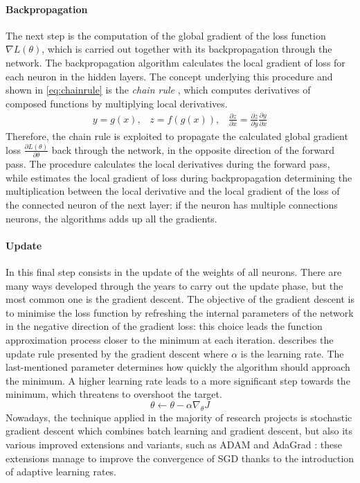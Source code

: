 \paragraph{Backpropagation}
The next step is the computation of the global gradient of the loss function $\nabla L(\theta)$, which is carried out together with its backpropagation through the network. The backpropagation algorithm \cite{rumelhart1988learning} calculates the local gradient of loss for each neuron in the hidden layers. The concept underlying this procedure and shown in \vref{eq:chainrule} is the \textit{chain rule} \cite{lecun2015deep}, which computes derivatives of composed functions by multiplying local derivatives.
\begin{equation}\label{eq:chainrule}
\begin{gathered}
y = g(x), \;\;\; z = f(g(x)),  \;\;\;
\frac{\partial z}{\partial x} = \frac{\partial z}{\partial y} \frac{\partial y}{\partial x}
\end{gathered}
\end{equation}
Therefore, the chain rule is exploited to propagate the calculated global gradient loss $\frac{\partial L(\theta)}{\partial \theta}$ back through the network, in the opposite direction of the forward pass.
The procedure calculates the local derivatives during the forward pass, while estimates the local gradient of loss during backpropagation determining the multiplication between the local derivative and the local gradient of the loss of the connected neuron of the next layer: if the neuron has multiple connections neurons, the algorithms adds up all the gradients.

\paragraph{Update} In this final step consists in the update of the weights of all neurons. There are many ways developed through the years to carry out the update phase, but the most common one is the gradient descent.
The objective of the gradient descent is to minimise the loss function by refreshing the internal parameters of the network in the negative direction of the gradient loss: this choice leads the function approximation process closer to the minimum at each iteration.  describes the update rule presented by the gradient descent where $\alpha$ is the learning rate. The last-mentioned parameter determines how quickly the algorithm should approach the minimum. A higher learning rate leads to a more significant step towards the minimum, which threatens to overshoot the target.
\begin{equation}\label{eq:update}
\theta \leftarrow \theta -\alpha \nabla_\theta J
\end{equation}
Nowadays, the technique applied in the majority of research projects is stochastic gradient descent which combines batch learning \cite{stanford2019cs231n} and gradient descent, but also its various improved extensions and variants, such as ADAM \cite{kingma2014adam} and AdaGrad \cite{duchi2011adaptive}: these extensions manage to improve the convergence of SGD thanks to the introduction of adaptive learning rates.

